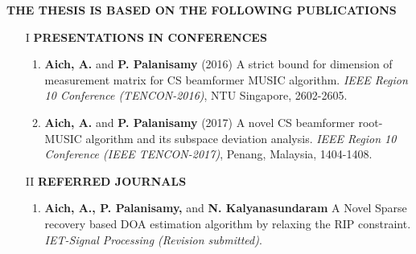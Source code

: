 \documentclass[12pt,a4paper]{article}
\theoremstyle{plain}
\theoremstyle{definition}
\begin{document}
\newpage
\begin{center}
\textbf{THE THESIS IS BASED ON THE FOLLOWING PUBLICATIONS}
\end{center}
\bigskip

\begin{itemize}

\item[I] \textbf{PRESENTATIONS IN CONFERENCES}

\begin{enumerate}[ 1. ]
\item \textbf{Aich, A.} and \textbf{P. Palanisamy} (2016) A strict bound for dimension of measurement matrix for CS beamformer MUSIC algorithm. \emph{IEEE Region 10 Conference (TENCON-2016)}, NTU Singapore, 2602-2605.

\item \textbf{Aich, A.} and \textbf{P. Palanisamy} (2017) A novel CS beamformer root-MUSIC algorithm and its subspace deviation analysis. \emph{IEEE Region 10 Conference (IEEE TENCON-2017)}, Penang, Malaysia, 1404-1408.

\end{enumerate}

\item[II] \textbf{REFERRED JOURNALS}
\begin{enumerate}[ 1. ]
\item \textbf{Aich, A., P. Palanisamy,} and \textbf{N. Kalyanasundaram} A Novel Sparse recovery based DOA estimation algorithm by relaxing the RIP constraint. \emph{IET-Signal Processing (Revision submitted)}.

\end{enumerate}
\end{itemize}

 
\end{document}
